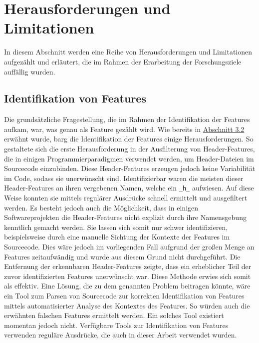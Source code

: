 \section{Herausforderungen und Limitationen}

In diesem Abschnitt werden eine Reihe von Herausforderungen und Limitationen aufgezählt und erläutert, die im Rahmen der Erarbeitung der Forschungsziele auffällig wurden.

\subsection*{Identifikation von Features}

Die grundsätzliche Fragestellung, die im Rahmen der Identifikation der Features aufkam, war, was genau als Feature gezählt wird. Wie bereits in \hyperref[construction]{Abschnitt 3.2} erwähnt wurde, barg die Identifikation der Features einige Herausforderungen. So gestaltete sich die erste Herausforderung in der Ausfilterung von \glqq Header-Features\grqq{}, die in einigen Programmierparadigmen verwendet werden, um Header-Dateien im Sourcecode einzubinden. Diese Header-Features erzeugen jedoch keine Variabilität im Code, sodass sie unerwünscht sind. Identifizierbar waren die meisten dieser Header-Features an ihren vergebenen Namen, welche ein \texttt{\_h\_} aufwiesen. Auf diese Weise konnten sie mittels regulärer Ausdrücke schnell ermittelt und ausgefiltert werden. Es besteht jedoch auch die Möglichkeit, dass in einigen Softwareprojekten die Header-Features nicht explizit durch ihre Namensgebung kenntlich gemacht werden. Sie lassen sich somit nur schwer identifizieren, beispielsweise durch eine manuelle Sichtung der Kontexte der Features im Sourcecode. Dies wäre jedoch im vorliegenden Fall aufgrund der großen Menge an Features zeitaufwändig und wurde aus diesem Grund nicht durchgeführt. Die Entfernung der erkennbaren Header-Features zeigte, dass ein erheblicher Teil der zuvor identifizierten Features unerwünscht war. Diese Methode erwies sich somit als effektiv.
Eine Lösung, die zu dem genannten Problem beitragen könnte, wäre ein Tool zum Parsen von Sourcecode zur korrekten Identifikation von Features mittels automatisierter Analyse des Kontextes des Features. So würden auch die erwähnten \glqq falschen\grqq{} Features ermittelt werden. Ein solches Tool existiert momentan jedoch nicht. Verfügbare Tools zur Identifikation von Features verwenden reguläre Ausdrücke, die auch in dieser Arbeit verwendet wurden.

